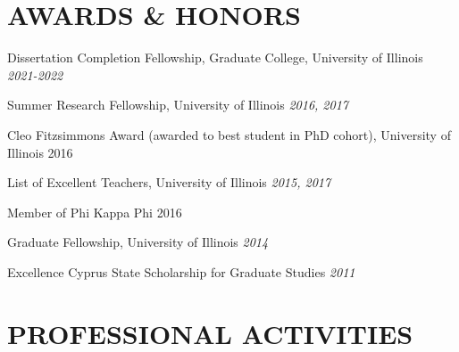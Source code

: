 \documentclass{article}
\begin{document}


\section{AWARDS \& HONORS}

Dissertation Completion Fellowship, Graduate College, University of Illinois \hfill \emph{2021-2022}

Summer Research Fellowship, University of Illinois \hfill \emph{2016, 2017}

Cleo Fitzsimmons Award (awarded to best student in PhD cohort), University of Illinois \hfill 2016

List of Excellent Teachers, University of Illinois \hfill \emph{2015, 2017}

Member of Phi Kappa Phi \hfill {2016}

Graduate Fellowship, University of Illinois \hfill \emph{2014}

Excellence Cyprus State Scholarship for Graduate Studies \hfill \emph{2011}


\section{PROFESSIONAL ACTIVITIES}
\end{document}
